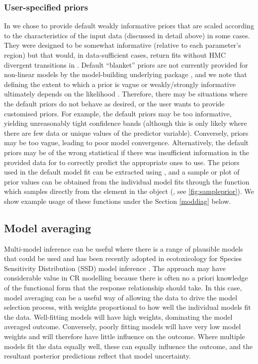 \documentclass[
  shortnames]{jss}
\begin{document}
\subsubsection[User-specified priors]{User-specified priors}\label{usp}

In  we chose to provide default weakly informative priors that are scaled according to the characteristics of the input data (discussed in detail above) in some cases. They were designed to be somewhat informative (relative to each parameter's region) but that would, in data-sufficient cases, return fits without HMC divergent transitions in . Default ``blanket'' priors are not currently provided for non-linear models by the model-building underlying package , and we note that defining the extent to which a prior is vague or weakly/strongly informative ultimately depends on the likelihood \citep{gelman2017entropy}. Therefore, there may be situations where the default  priors do not behave as desired, or the user wants to provide customised priors. For example, the default priors may be too informative, yielding unreasonably tight confidence bands (although this is only likely where there are few data or unique values of the predictor variable). Conversely, priors may be too vague, leading to poor model convergence. Alternatively, the default priors may be of the wrong statistical  if there was insufficient information in the provided data for  to correctly predict the appropriate ones to use. The priors used in the default model fit can be extracted using , and a sample or plot of prior values can be obtained from the individual  model fits through the function  which samples directly from the  element in the  object (, see \autoref{fig:sampleprior}). We show example usage of these functions under the Section \ref{moddiag} below.

\subsection[Model averaging]{Model averaging}\label{modavg}

Multi-model inference can be useful where there is a range of plausible models that could be used \citep{Burnham2002} and has been recently adopted in ecotoxicology for Species Sensitivity Distribution (SSD) model inference \citep{Thorley2018, fox2020, Dalgarno}. The approach may have considerable value in CR modelling because there is often no a priori knowledge of the functional form that the response relationship should take. In this case, model averaging can be a useful way of allowing the data to drive the model selection process, with weights proportional to how well the individual models fit the data. Well-fitting models will have high weights, dominating the model averaged outcome. Conversely, poorly fitting models will have very low model weights and will therefore have little influence on the outcome. Where multiple models fit the data equally well, these can equally influence the outcome, and the resultant posterior predictions reflect that model uncertainty.
\end{document}
